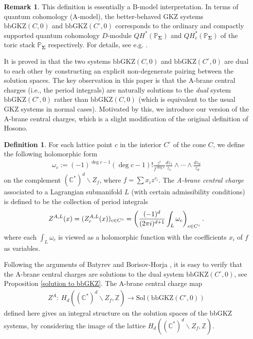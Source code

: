 \documentclass[11pt,reqno]{amsart}
\def\CC {{\mathbb C}}
\def\Z {{\mathbb Z}}
\def\PP {{\mathbb P}}
\theoremstyle{definition}
\newtheorem{definition}[theorem]{Definition}
\newtheorem{remark}[theorem]{Remark}
\numberwithin{equation}{section}
\begin{document}
\begin{remark}\label{A-model interpretation}
	This definition is essentially a B-model interpretation. In terms of quantum cohomology (A-model), the better-behaved GKZ systems $\mathrm{bbGKZ}(C,0)$ and $\mathrm{bbGKZ}(C^{\circ},0)$ corresponds to the ordinary and compactly supported quantum cohomology $D$-module $QH^*(\PP_{\mathbf{\Sigma}})$ and $QH^*_c(\PP_{\mathbf{\Sigma}})$ of the toric stack $\PP_{\mathbf{\Sigma}}$ respectively. For details, see e.g. \cite{I-1}.
\end{remark}

\smallskip

It is proved in \cite{BHanDuality} that the two systems $\mathrm{bbGKZ}(C,0)$ and $\mathrm{bbGKZ}(C^{\circ},0)$ are dual to each other by constructing an explicit non-degenerate pairing between the solution spaces. The key observation in this paper is that the A-brane central charges (i.e., the period integrals) are naturally solutions to the \textit{dual} system $\mathrm{bbGKZ}(C^{\circ},0)$ rather than $\mathrm{bbGKZ}(C,0)$ (which is equivalent to the usual GKZ systems in normal cases). Motivated by this, we introduce our version of the A-brane central charges, which is a slight modification of the original definition of Hosono.

\smallskip

\begin{definition}
	For each lattice point $c$ in the interior $C^{\circ}$ of the cone $C$, we define the following holomorphic form
	\begin{align*}
		\omega_c:=(-1)^{\deg c-1}(\deg c-1)!\frac{z^c}{f^{\deg c}}\frac{dz_1}{z_1}\wedge\cdots\wedge\frac{dz_d}{z_d}
	\end{align*}
	on the complement $(\CC^*)^d\backslash Z_f$, where $f=\sum x_i z^{v_i}$. The \textit{A-brane central charge} associated to a Lagrangian submanifold $L$ (with certain admissibility conditions) is defined to be the collection of period integrals
	\begin{align*}
		Z^{A,L}(x)=(Z^{A,L}_c(x))_{c\in C^{\circ}}=\left(\frac{(-1)^d}{(2\pi{\rm i})^{d+1}}\int_{L}\omega_c\right)_{c\in C^{\circ}}.
	\end{align*}
	where each $\int_{L}\omega_c$ is viewed as a holomorphic function with the coefficients $x_i$ of $f$ as variables.
\end{definition}


\smallskip

Following the arguments of Batyrev \cite{Batyrev} and Borisov-Horja \cite{BH}, it is easy to verify that the A-brane central charges are solutions to the dual system $\mathrm{bbGKZ}(C^{\circ},0)$, see Proposition \ref{solution to bbGKZ}. The A-brane central charge map 
\begin{align*}
	Z^A:\ H_d((\CC^*)^d\backslash Z_f,\Z) \rightarrow \mathrm{Sol}(\mathrm{bbGKZ}(C^{\circ},0))
\end{align*}
defined here gives an integral structure on the solution spaces of the bbGKZ systems, by considering the image of the lattice $H_d((\CC^*)^d\backslash Z_f,\Z)$.
\end{document}
